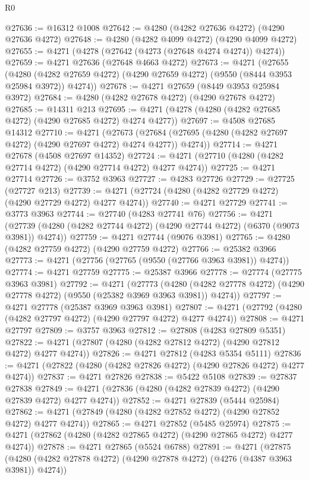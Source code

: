 \begin{lexlean}{R0}
\begin{coremodule}
@27636 := @16312 @1008
@27642 := @4280 (@4282 @27636 @4272) (@4290 @27636 @4272)
@27648 := @4280 (@4282 @4099 @4272) (@4290 @4099 @4272)
@27655 := @4271 (@4278 (@27642 (@4273 (@27648 @4274 @4274)) @4274))
@27659 := @4271 @27636 (@27648 @4663 @4272)
@27673 := @4271
    (@27655
      (@4280 (@4282 @27659 @4272) (@4290 @27659 @4272) (@9550 (@8444 @3953 @25984 @3972)) @4274))
@27678 := @4271 @27659 (@8449 @3953 @25984 @3972)
@27684 := @4280 (@4282 @27678 @4272) (@4290 @27678 @4272)
@27685 := @14311 @213
@27695 := @4271 (@4278 (@4280 (@4282 @27685 @4272) (@4290 @27685 @4272) @4274 @4277))
@27697 := @4508 @27685 @14312
@27710 := @4271
    (@27673 (@27684 (@27695 (@4280 (@4282 @27697 @4272) (@4290 @27697 @4272) @4274 @4277)) @4274))
@27714 := @4271 @27678 (@4508 @27697 @14352)
@27724 := @4271 (@27710 (@4280 (@4282 @27714 @4272) (@4290 @27714 @4272) @4277 @4274))
@27725 := @4271 @27714
@27726 := @3752 @3963
@27727 := @4283 @27726
@27729 := @27725 (@27727 @213)
@27739 := @4271 (@27724 (@4280 (@4282 @27729 @4272) (@4290 @27729 @4272) @4277 @4274))
@27740 := @4271 @27729
@27741 := @3773 @3963
@27744 := @27740 (@4283 @27741 @76)
@27756 := @4271
    (@27739 (@4280 (@4282 @27744 @4272) (@4290 @27744 @4272) (@6370 (@9073 @3981)) @4274))
@27759 := @4271 @27744 (@9076 @3981)
@27765 := @4280 (@4282 @27759 @4272) (@4290 @27759 @4272)
@27766 := @25382 @3966
@27773 := @4271 (@27756 (@27765 (@9550 (@27766 @3963 @3981)) @4274))
@27774 := @4271 @27759
@27775 := @25387 @3966
@27778 := @27774 (@27775 @3963 @3981)
@27792 := @4271
    (@27773
      (@4280 (@4282 @27778 @4272) (@4290 @27778 @4272) (@9550 (@25382 @3969 @3963 @3981)) @4274))
@27797 := @4271 @27778 (@25387 @3969 @3963 @3981)
@27807 := @4271 (@27792 (@4280 (@4282 @27797 @4272) (@4290 @27797 @4272) @4277 @4274))
@27808 := @4271 @27797
@27809 := @3757 @3963
@27812 := @27808 (@4283 @27809 @5351)
@27822 := @4271 (@27807 (@4280 (@4282 @27812 @4272) (@4290 @27812 @4272) @4277 @4274))
@27826 := @4271 @27812 (@4283 @5354 @5111)
@27836 := @4271 (@27822 (@4280 (@4282 @27826 @4272) (@4290 @27826 @4272) @4277 @4274))
@27837 := @4271 @27826
@27838 := @5422 @5108
@27839 := @27837 @27838
@27849 := @4271 (@27836 (@4280 (@4282 @27839 @4272) (@4290 @27839 @4272) @4277 @4274))
@27852 := @4271 @27839 (@5444 @25984)
@27862 := @4271 (@27849 (@4280 (@4282 @27852 @4272) (@4290 @27852 @4272) @4277 @4274))
@27865 := @4271 @27852 (@5485 @25974)
@27875 := @4271 (@27862 (@4280 (@4282 @27865 @4272) (@4290 @27865 @4272) @4277 @4274))
@27878 := @4271 @27865 (@5524 @6788)
@27891 := @4271
    (@27875 (@4280 (@4282 @27878 @4272) (@4290 @27878 @4272) (@4276 (@4387 @3963 @3981)) @4274))

\end{coremodule}
\end{lexlean}
